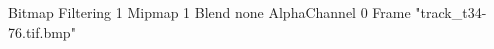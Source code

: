 {Bitmap
	{Filtering 1}
	{Mipmap 1}
	{Blend none}
	{AlphaChannel 0}
	{Frame "track_t34-76.tif.bmp"}
}
